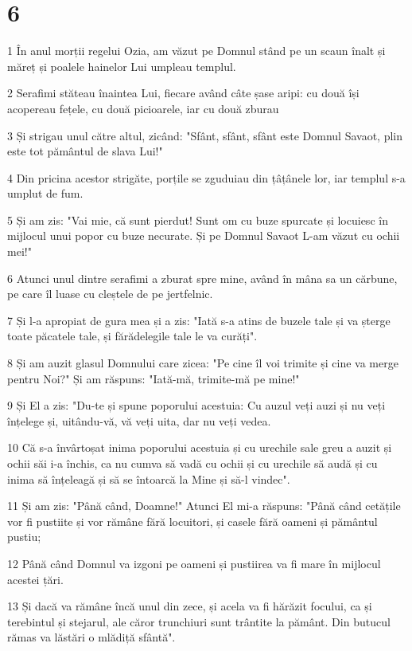 \chapter{6}

\par 1 În anul morții regelui Ozia, am văzut pe Domnul stând pe un scaun înalt și măreț și poalele hainelor Lui umpleau templul.
\par 2 Serafimi stăteau înaintea Lui, fiecare având câte șase aripi: cu două își acopereau fețele, cu două picioarele, iar cu două zburau
\par 3 Și strigau unul către altul, zicând: "Sfânt, sfânt, sfânt este Domnul Savaot, plin este tot pământul de slava Lui!"
\par 4 Din pricina acestor strigăte, porțile se zguduiau din țâțânele lor, iar templul s-a umplut de fum.
\par 5 Și am zis: "Vai mie, că sunt pierdut! Sunt om cu buze spurcate și locuiesc în mijlocul unui popor cu buze necurate. Și pe Domnul Savaot L-am văzut cu ochii mei!"
\par 6 Atunci unul dintre serafimi a zburat spre mine, având în mâna sa un cărbune, pe care îl luase cu cleștele de pe jertfelnic.
\par 7 Și l-a apropiat de gura mea și a zis: "Iată s-a atins de buzele tale și va șterge toate păcatele tale, și fărădelegile tale le va curăți".
\par 8 Și am auzit glasul Domnului care zicea: "Pe cine îl voi trimite și cine va merge pentru Noi?" Și am răspuns: "Iată-mă, trimite-mă pe mine!"
\par 9 Și El a zis: "Du-te și spune poporului acestuia: Cu auzul veți auzi și nu veți înțelege și, uitându-vă, vă veți uita, dar nu veți vedea.
\par 10 Că s-a învârtoșat inima poporului acestuia și cu urechile sale greu a auzit și ochii săi i-a închis, ca nu cumva să vadă cu ochii și cu urechile să audă și cu inima să înțeleagă și să se întoarcă la Mine și să-l vindec".
\par 11 Și am zis: "Până când, Doamne!" Atunci El mi-a răspuns: "Până când cetățile vor fi pustiite și vor rămâne fără locuitori, și casele fără oameni și pământul pustiu;
\par 12 Până când Domnul va izgoni pe oameni și pustiirea va fi mare în mijlocul acestei țări.
\par 13 Și dacă va rămâne încă unul din zece, și acela va fi hărăzit focului, ca și terebintul și stejarul, ale căror trunchiuri sunt trântite la pământ. Din butucul rămas va lăstări o mlădiță sfântă".

